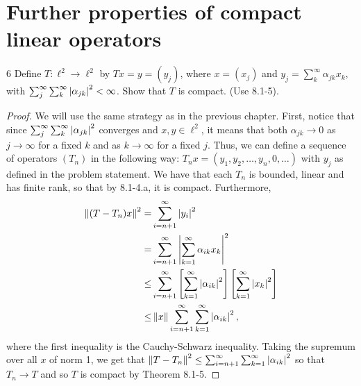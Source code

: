 \section{Further properties of compact linear operators}


\begin{exercise}{6}
Define $T: \ell^2 \to \ell^2$ by $T x = y = (y_j)$, where $x = (x_j)$ and $y_j = \sum_k^\infty \alpha_{j k} x_k$, with $\sum_j^\infty \sum_k^\infty \left\lvert \alpha_{jk}\right\rvert^2 < \infty$.
Show that $T$ is compact.
(Use 8.1-5).
\end{exercise}
\begin{proof}
We will use the same strategy as in the previous chapter. 
First, notice that since $\sum_j^\infty \sum_k^\infty \left\lvert \alpha_{jk}\right\rvert^2$ converges and $x, y \in \ell^2$, it means that both $\alpha_{j k} \to 0$ as $j \to \infty$ for a fixed $k$ and as $k \to \infty$ for a fixed $j$.
Thus, we can define a sequence of operators $(T_n)$ in the following way:
$T_n x = (y_1, y_2, \dots, y_n, 0, \dots)$ with $y_j$ as defined in the problem statement.
We have that each $T_n$ is bounded, linear and has finite rank, so that by 8.1-4.a, it is compact. 
Furthermore,
\begin{align*}
    \left\lVert (T - T_n) x\right\rVert^2
    =& \sum_{i = n+1}^\infty \left\lvert y_i\right\rvert^2\\
    =& \sum_{i = n+1}^\infty \left\lvert \sum_{k = 1}^\infty \alpha_{i k} x_k\right\rvert^2\\
    \leq& \sum_{i = n+1}^\infty \left[ \sum_{k = 1}^\infty \left\lvert \alpha_{i k}\right\rvert^2\right] \left[ \sum_{k = 1}^\infty \left\lvert x_k\right\rvert^2\right]\\
    \leq& \left\lVert x\right\rVert \sum_{i = n+1}^\infty \sum_{k = 1}^\infty \left\lvert \alpha_{i k}\right\rvert^2,
\end{align*}
where the first inequality is the Cauchy-Schwarz inequality.
Taking the supremum over all $x$ of norm 1, we get that $\left\lVert T - T_n\right\rVert^2 \leq \sum_{i = n+1}^\infty \sum_{k = 1}^\infty \left\lvert \alpha_{i k}\right\rvert^2$ so that $T_n \to T$ and so $T$ is compact by Theorem 8.1-5.
\end{proof} 

